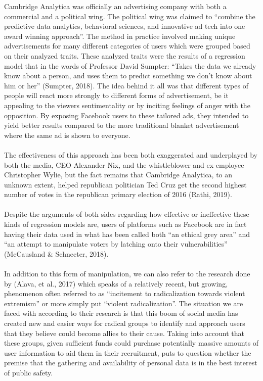 \documentclass[11pt]{article}
\begin{document}
Cambridge Analytica was officially an advertising company with both a commercial and a political wing. The political wing was claimed to “combine the predictive data analytics, behavioral sciences, and innovative ad tech into one award winning approach”. The method in practice involved making unique advertisements for many different categories of users which were grouped based on their analyzed traits. These analyzed traits were the results of a regression model that in the words of Professor David Sumpter: “Takes the data we already know about a person, and uses them to predict something we don’t know about him or her” (Sumpter, 2018). The idea behind it all was that different types of people will react more strongly to different forms of advertisement, be it appealing to the viewers sentimentality or by inciting feelings of anger with the opposition. By exposing Facebook users to these tailored ads, they intended to yield better results compared to the more traditional blanket advertisement where the same ad is shown to everyone.  
\\ \\
The effectiveness of this approach has been both exaggerated and underplayed by both the media, CEO Alexander Nix, and the whistleblower and ex-employee Christopher Wylie, but the fact remains that Cambridge Analytica, to an unknown extent, helped republican politician Ted Cruz get the second highest number of votes in the republican primary election of 2016 (Rathi, 2019). 
\\ \\
Despite the arguments of both sides regarding how effective or ineffective these kinds of regression models are, users of platforms such as Facebook are in fact having their data used in what has been called both “an ethical grey area” and “an attempt to manipulate voters by latching onto their vulnerabilities” (McCausland \& Schnecter, 2018). \\ \\

 

In addition to this form of manipulation, we can also refer to the research done by (Alava, et al., 2017) which speaks of a relatively recent, but growing, phenomenon often referred to as “incitement to radicalization towards violent extremism” or more simply put “violent radicalization”. The situation we are faced with according to their research is that this boom of social media has created new and easier ways for radical groups to identify and approach users that they believe could become allies to their cause. Taking into account that these groups, given sufficient funds could purchase potentially massive amounts of user information to aid them in their recruitment, puts to question whether the premise that the gathering and availability of personal data is in the best interest of public safety. \\ \\
\end{document}
